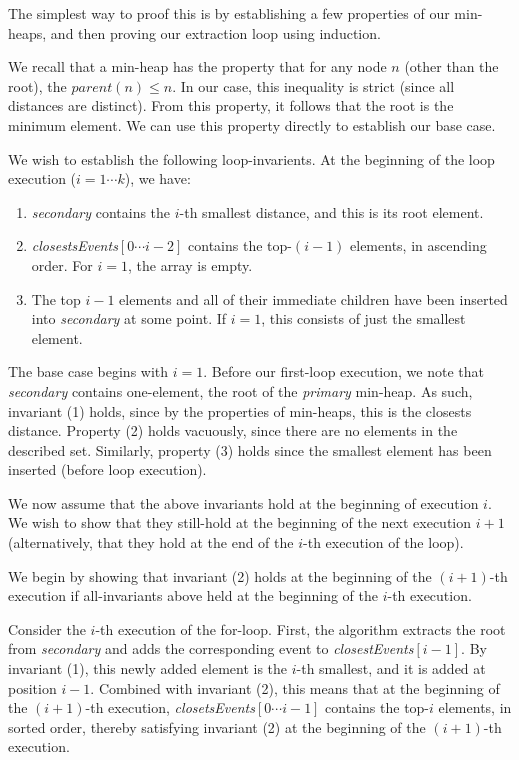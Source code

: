 \documentclass[12pt]{exam}
\begin{document}
\begin{questions}
\begin{solution}
The simplest way to proof this is by establishing a few properties of our min-heaps, and then proving our extraction loop using induction.
 
We recall that a min-heap has the property that for any node $n$ (other than the root), the $parent(n) \leq n$. In our case, this inequality is strict (since all distances are distinct). From this property, it follows that the root is the minimum element. We can use this property directly to establish our base case.

We wish to establish the following loop-invarients. At the beginning of the loop execution ($i = 1 \cdots k$), we have:
\begin{enumerate}
  \item \textit{secondary} contains the $i$-th smallest distance, and this is its root element.
  \item \textit{closestsEvents}$[0 \cdots i-2]$ contains the top-$(i-1)$ elements, in ascending order. For $i = 1$, the array is empty.
  \item The top $i-1$ elements and all of their immediate children have been inserted into \textit{secondary} at some point. If $i = 1$, this consists of just the smallest element.
\end{enumerate}

The base case begins with $i = 1$. Before our first-loop execution, we note that \textit{secondary} contains one-element, the root of the \textit{primary} min-heap. As such, invariant (1) holds, since by the properties of min-heaps, this is the closests distance. Property (2) holds vacuously, since there are no elements in the described set. Similarly, property (3) holds since the smallest element has been inserted (before loop execution).

We now assume that the above invariants hold at the beginning of execution $i$. We wish to show that they still-hold at the beginning of the next execution $i + 1$ (alternatively, that they hold at the end of the $i$-th execution of the loop).

We begin by showing that invariant (2) holds at the beginning of the $(i + 1)$-th execution if all-invariants above held at the beginning of the $i$-th execution.

Consider the $i$-th execution of the for-loop. First, the algorithm extracts the root from \textit{secondary} and adds the corresponding event to \textit{closestEvents}$[i-1]$. By invariant (1), this newly added element is the $i$-th smallest, and it is added at position $i - 1$. Combined with invariant (2), this means that at the beginning of the $(i+1)$-th execution, \textit{closetsEvents}$[0 \cdots i-1]$ contains the top-$i$ elements, in sorted order, thereby satisfying invariant (2) at the beginning of the $(i+1)$-th execution.


\end{solution}
\end{questions}
\end{document}
